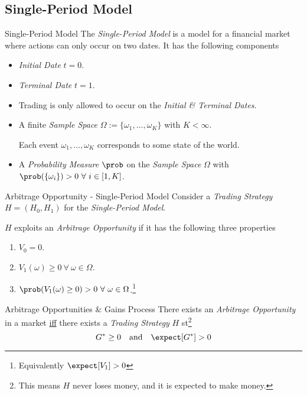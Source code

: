 \documentclass[11pt,a4paper]{article}
\begin{document}
\subsection{Single-Period Model}

  \begin{definition}{Single-Period Model}
    The \textit{Single-Period Model} is a model for a financial market where actions can only occur on two dates. It has the following components
    \begin{itemize}
      \item \textit{Initial Date} $t=0$.
      \item \textit{Terminal Date} $t=1$.
      \item Trading is only allowed to occur on the \textit{Initial \& Terminal Dates}.
      \item A finite \textit{Sample Space} $\Omega:=\{\omega_1,\dots,\omega_K\}$ with $K<\infty$.
      \par Each event $\omega_1,\dots,\omega_K$ corresponds to some state of the world.
      \item A \textit{Probability Measure} $\prob$ on the \textit{Sample Space} $\Omega$ with $\prob(\{\omega_i\})>0\ \forall\ i\in[1,K]$.
    \end{itemize}
  \end{definition}

  \begin{definition}{Arbitrage Opportunity - Single-Period Model}
    Consider a \textit{Trading Strategy} $H=(H_0,H_1)$ for the \textit{Single-Period Model}.
    \par $H$ exploits an \textit{Arbitrage Opportunity} if it has the following three properties
    \begin{enumerate}
      \item $V_0=0$.
      \item $V_1(\omega)\geq0\ \forall\ \omega\in\Omega$.
      \item $\prob(V_1(\omega)\geq0)>0\ \forall\ \omega\in\Omega$.\footnote{Equivalently $\expect[V_1]>0$}
    \end{enumerate}
  \end{definition}

  \begin{theorem}{Arbitrage Opportunities \& Gains Process}\label{the_arbitrage_opportunities_and_gains_processes}
    There exists an \textit{Arbitrage Opportunity} in a market \underline{iff} there exists a \textit{Trading Strategy} $H$ st\footnote{This means $H$ never loses money, and it is expected to make money.}
    \[ G^*\geq0\quad\text{and}\quad\expect[G^*]>0 \]
  \end{theorem}
\end{document}
